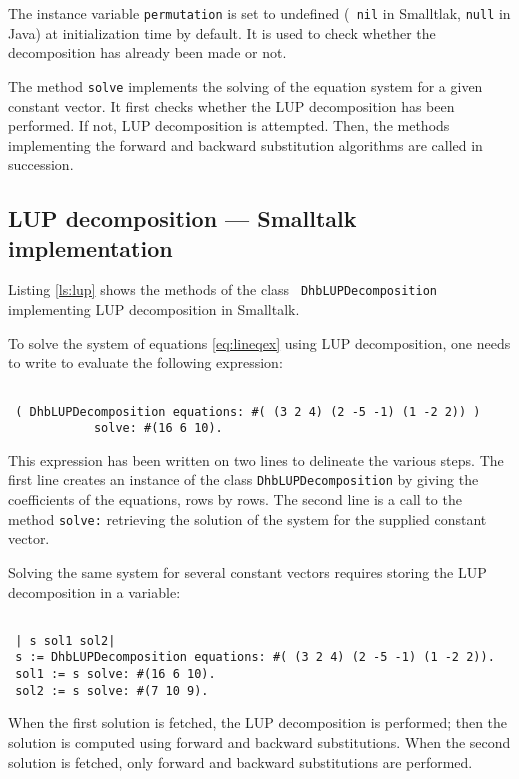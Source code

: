 \documentclass[twoside]{book}
\begin{document}
The instance variable {\tt permutation} is set to undefined ({\tt
nil} in Smalltlak, {\tt null} in Java) at initialization time by
default. It is used to check whether the decomposition has already
been made or not.

The method {\tt solve} implements the solving of the equation
system for a given constant vector. It first checks whether the
LUP decomposition has been performed. If not, LUP decomposition is
attempted. Then, the methods implementing the forward and backward
substitution algorithms are called in succession.

\subsection{LUP decomposition --- Smalltalk implementation}
Listing \ref{ls:lup} shows the methods of the class {\tt
DhbLUPDecomposition} implementing LUP decomposition in Smalltalk.

To solve the system of equations \ref{eq:lineqex} using LUP
decomposition, one needs to write to evaluate the following
expression:
\begin{codeExample}
\begin{verbatim}

 ( DhbLUPDecomposition equations: #( (3 2 4) (2 -5 -1) (1 -2 2)) )
            solve: #(16 6 10).
\end{verbatim}
\end{codeExample}
This expression has been written on two lines to delineate the
various steps. The first line creates an instance of the class
{\tt DhbLUPDecomposition} by giving the coefficients of the
equations, rows by rows. The second line is a call to the method
{\tt solve:} retrieving the solution of the system for the
supplied constant vector.

Solving the same system for several constant vectors requires
storing the LUP decomposition in a variable:
\begin{codeExample}
\begin{verbatim}

 | s sol1 sol2|
 s := DhbLUPDecomposition equations: #( (3 2 4) (2 -5 -1) (1 -2 2)).
 sol1 := s solve: #(16 6 10).
 sol2 := s solve: #(7 10 9).
\end{verbatim}
\end{codeExample}
When the first solution is fetched, the LUP decomposition is
performed; then the solution is computed using forward and
backward substitutions. When the second solution is fetched, only
forward and backward substitutions are performed.
\end{document}
